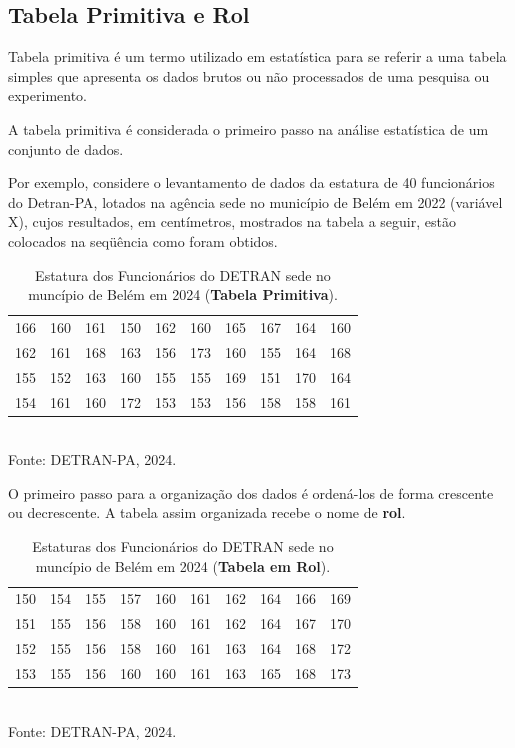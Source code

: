 \newpage
\subsection{Tabela Primitiva e Rol}

Tabela primitiva é um termo utilizado em estatística para se referir a uma tabela simples que apresenta os dados brutos ou não processados de uma pesquisa ou experimento.\vskip0.3cm

A tabela primitiva é considerada o primeiro passo na análise estatística de um conjunto de dados.\vskip0.3cm

Por exemplo, considere o levantamento de dados da estatura de 40 funcionários do Detran-PA, lotados na agência sede no município de Belém em 2022 (variável X), cujos resultados, em centímetros, mostrados na tabela a seguir, estão colocados na seqüência como foram obtidos.\vskip0.3cm


\begin{table}[!htb]
    \centering
    {
    \caption{Estatura dos Funcionários do DETRAN sede no muncípio de Belém em 2024 (\textbf{Tabela Primitiva}).}
    \label{estatura}
    \vspace{0.2cm}
\begin{tabular}{c|c|c|c|c|c|c|c|c|c}
  \hline\hline
  166 & 160 & 161 & 150 & 162 & 160 & 165 & 167 & 164 & 160 \\
  162 & 161 & 168 & 163 & 156 & 173 & 160 & 155 & 164 & 168 \\
  155 & 152 & 163 & 160 & 155 & 155 & 169 & 151 & 170 & 164 \\
  154 & 161 & 160 & 172 & 153 & 153 & 156 & 158 & 158 & 161 \\
  \hline\hline
\end{tabular}}
\\
\hspace{-5.5cm} 
Fonte: DETRAN-PA, 2024.
\end{table}



O primeiro passo para a organização dos dados é ordená-los de forma crescente ou decrescente. A tabela assim organizada recebe o nome de \textbf{rol}.


\begin{table}[!htb]
    \centering
    {
    \caption{Estaturas dos Funcionários do DETRAN sede no muncípio de Belém em 2024 (\textbf{Tabela em Rol}).}
    \label{estatura2}
    \vspace{0.2cm}
\begin{tabular}{c|c|c|c|c|c|c|c|c|c}
  \hline\hline
  150 & 154 & 155 & 157 & 160 & 161 & 162 & 164 & 166 & 169 \\
  151 & 155 & 156 & 158 & 160 & 161 & 162 & 164 & 167 & 170 \\
  152 & 155 & 156 & 158 & 160 & 161 & 163 & 164 & 168 & 172 \\
  153 & 155 & 156 & 160 & 160 & 161 & 163 & 165 & 168 & 173 \\
  \hline\hline
\end{tabular}}
\\
\hspace{-5.4cm} Fonte: DETRAN-PA, 2024.
\end{table}


